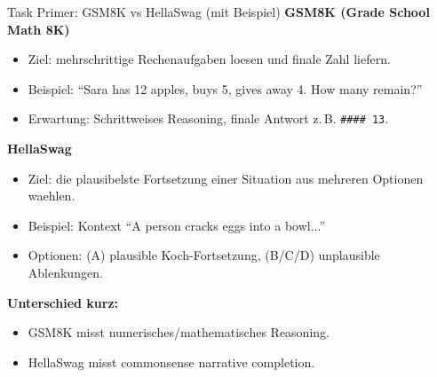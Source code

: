 \documentclass[aspectratio=169,11pt]{beamer}
\begin{document}
\begin{frame}{Task Primer: GSM8K vs HellaSwag (mit Beispiel)}
\textbf{GSM8K (Grade School Math 8K)}
\begin{itemize}
  \item Ziel: mehrschrittige Rechenaufgaben loesen und finale Zahl liefern.
  \item Beispiel: \enquote{Sara has 12 apples, buys 5, gives away 4. How many remain?}
  \item Erwartung: Schrittweises Reasoning, finale Antwort z.\,B. \texttt{#### 13}.
\end{itemize}

\textbf{HellaSwag}
\begin{itemize}
  \item Ziel: die plausibelste Fortsetzung einer Situation aus mehreren Optionen waehlen.
  \item Beispiel: Kontext \enquote{A person cracks eggs into a bowl...}
  \item Optionen: (A) plausible Koch-Fortsetzung, (B/C/D) unplausible Ablenkungen.
\end{itemize}

\textbf{Unterschied kurz:}
\begin{itemize}
  \item GSM8K misst numerisches/mathematisches Reasoning.
  \item HellaSwag misst commonsense narrative completion.
\end{itemize}
\end{frame}
\end{document}
